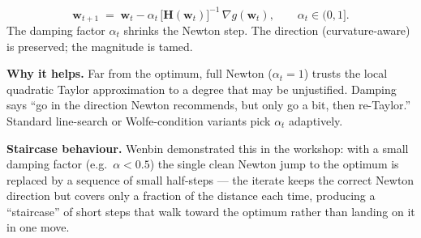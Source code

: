 \documentclass[11pt, a4paper]{article}
\begin{document}
\begin{defbox}
\[
\mathbf{w}_{t+1} \;=\; \mathbf{w}_t - \alpha_t\,\big[\mathbf{H}(\mathbf{w}_t)\big]^{-1}\,\nabla g(\mathbf{w}_t), \qquad \alpha_t \in (0,1].
\]
The damping factor $\alpha_t$ shrinks the Newton step. The direction (curvature-aware) is preserved; the magnitude is tamed.
\end{defbox}

\textbf{Why it helps.} Far from the optimum, full Newton ($\alpha_t = 1$) trusts the local quadratic Taylor approximation to a degree that may be unjustified. Damping says ``go in the direction Newton recommends, but only go a bit, then re-Taylor.'' Standard line-search or Wolfe-condition variants pick $\alpha_t$ adaptively.

\textbf{Staircase behaviour.} Wenbin demonstrated this in the workshop: with a small damping factor (e.g.\ $\alpha < 0.5$) the single clean Newton jump to the optimum is replaced by a sequence of small half-steps — the iterate keeps the correct Newton direction but covers only a fraction of the distance each time, producing a ``staircase'' of short steps that walk toward the optimum rather than landing on it in one move.
\end{document}
